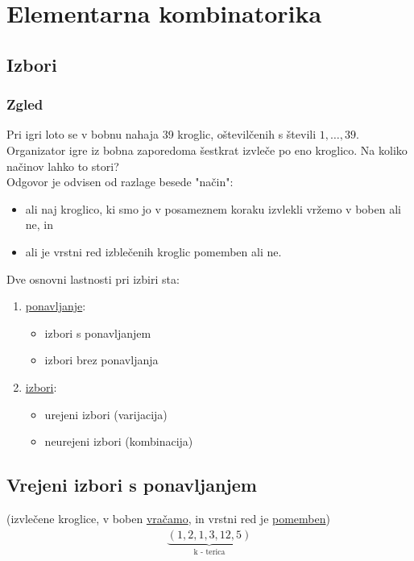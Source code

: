 \section{Elementarna kombinatorika}

\subsection{Izbori}

\subsubsection{Zgled}
Pri igri loto se v bobnu nahaja 39 kroglic, oštevilčenih s števili $1, \dots, 39$. Organizator igre iz bobna zaporedoma šestkrat izvleče po eno kroglico. Na koliko načinov lahko to stori? \\[1em]
Odgovor je odvisen od razlage besede "način":
\begin{itemize}
    \item ali naj kroglico, ki smo jo v posameznem koraku izvlekli vržemo v boben ali ne, in 
    \item ali je vrstni red izblečenih kroglic pomemben ali ne.
\end{itemize}
Dve osnovni lastnosti pri izbiri sta:
\begin{enumerate}
    \item \underline{ponavljanje}:
    \begin{itemize}
        \item izbori s ponavljanjem
        \item izbori brez ponavljanja
    \end{itemize}
    \item \underline{izbori}:
    \begin{itemize}
        \item urejeni izbori (varijacija)
        \item neurejeni izbori (kombinacija)
    \end{itemize}
\end{enumerate}

\subsection{Vrejeni izbori s ponavljanjem}
(izvlečene kroglice, v boben \underline{vračamo}, in vrstni red je \underline{pomemben})
\begin{align*}
    \underset{\text{k - terica}}{\underbrace{(1, 2, 1, 3, 12, 5)}}
\end{align*}

